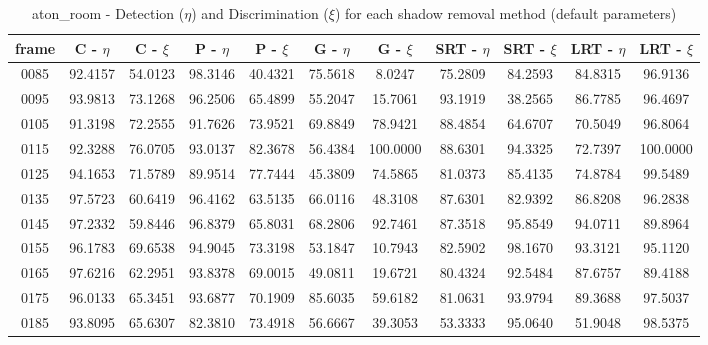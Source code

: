\begin{appendices}
\begin{table}
\centering
\caption{aton\_room - Detection ($\eta$) and Discrimination ($\xi$) for each shadow removal method (default parameters)}
\begin{tabular}{ |c|c|c|c|c|c|c|c|c|c|c| }
	\hline
\textbf{frame} &  \textbf{C - $\eta$} &  \textbf{C - $\xi$} &  \textbf{P - $\eta$} &  \textbf{P - $\xi$} &  \textbf{G - $\eta$} &  \textbf{G - $\xi$} &  \textbf{SRT - $\eta$} &  \textbf{SRT - $\xi$} &  \textbf{LRT - $\eta$} &  \textbf{LRT - $\xi$} \\
\hline
\hline
0085 &  92.4157 &  54.0123 &   98.3146 &  40.4321 &   75.5618 &  8.0247 &   75.2809 &  84.2593 &   84.8315 &  96.9136    \\
\hline
0095 &  93.9813 &  73.1268 &   96.2506 &  65.4899 &   55.2047 &  15.7061 &   93.1919 &  38.2565 &   86.7785 &  96.4697    \\
\hline
0105 &  91.3198 &  72.2555 &   91.7626 &  73.9521 &   69.8849 &  78.9421 &   88.4854 &  64.6707 &   70.5049 &  96.8064    \\
\hline
0115 &  92.3288 &  76.0705 &   93.0137 &  82.3678 &   56.4384 &  100.0000 &   88.6301 &  94.3325 &   72.7397 &  100.0000    \\
\hline
0125 &  94.1653 &  71.5789 &   89.9514 &  77.7444 &   45.3809 &  74.5865 &   81.0373 &  85.4135 &   74.8784 &  99.5489    \\
\hline
0135 &  97.5723 &  60.6419 &   96.4162 &  63.5135 &   66.0116 &  48.3108 &   87.6301 &  82.9392 &   86.8208 &  96.2838    \\
\hline
0145 &  97.2332 &  59.8446 &   96.8379 &  65.8031 &   68.2806 &  92.7461 &   87.3518 &  95.8549 &   94.0711 &  89.8964    \\
\hline
0155 &  96.1783 &  69.6538 &   94.9045 &  73.3198 &   53.1847 &  10.7943 &   82.5902 &  98.1670 &   93.3121 &  95.1120    \\
\hline
0165 &  97.6216 &  62.2951 &   93.8378 &  69.0015 &   49.0811 &  19.6721 &   80.4324 &  92.5484 &   87.6757 &  89.4188    \\
\hline
0175 &  96.0133 &  65.3451 &   93.6877 &  70.1909 &   85.6035 &  59.6182 &   81.0631 &  93.9794 &   89.3688 &  97.5037    \\
\hline
0185 &  93.8095 &  65.6307 &   82.3810 &  73.4918 &   56.6667 &  39.3053 &   53.3333 &  95.0640 &   51.9048 &  98.5375    \\
\hline

\end{tabular}
\end{table}
\end{appendices}
